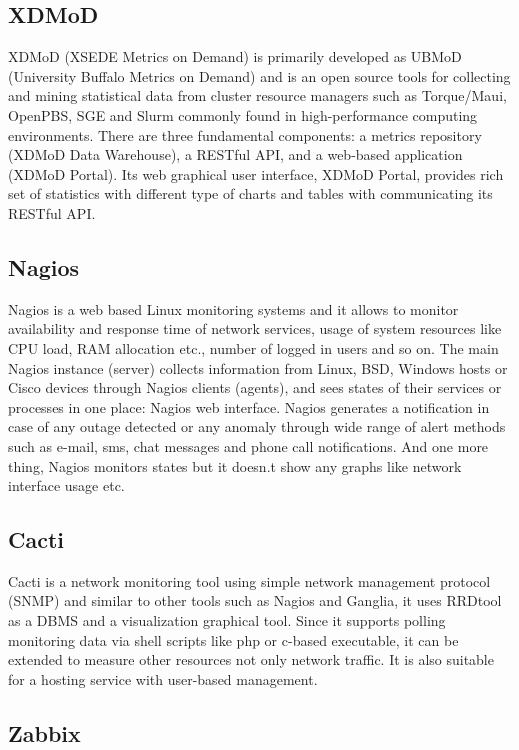 \documentclass{sig-alternate}
\begin{document}
\subsection{XDMoD}

XDMoD (XSEDE Metrics on Demand) is primarily developed as UBMoD (University Buffalo Metrics on Demand) and is an open source tools for collecting and mining statistical data from cluster resource managers such as Torque/Maui, OpenPBS, SGE and Slurm commonly found in high-performance computing environments. There are three fundamental components: a metrics repository (XDMoD Data Warehouse), a RESTful API, and a web-based application (XDMoD Portal). Its web graphical user interface, XDMoD Portal, provides rich set of statistics with different type of charts and tables with communicating its RESTful API.~\cite{CPE:CPE2871,Furlani:2013:UXF:2484762.2484763}

\subsection{Nagios}

Nagios is a web based Linux monitoring systems and it allows to monitor availability and response time of network services, usage of system resources like CPU load, RAM allocation etc., number of logged in users and so on. The main Nagios instance (server) collects information from Linux, BSD, Windows hosts or Cisco devices through Nagios clients (agents), and sees states of their services or processes in one place: Nagios web interface. Nagios generates a notification in case of any outage detected or any anomaly through wide range of alert methods such as e-mail, sms, chat messages and phone call notifications. And one more thing, Nagios monitors states but it doesn.t show any graphs like network interface usage etc.

\subsection{Cacti}
Cacti is a network monitoring tool using simple network management protocol (SNMP) and similar to other tools such as Nagios and Ganglia, it uses RRDtool as a DBMS and a visualization graphical tool. Since it supports polling monitoring data via shell scripts like php or c-based executable, it can be extended to measure other resources not only network traffic. It is also suitable for a hosting service with user-based management.

\subsection{Zabbix}
\end{document}
